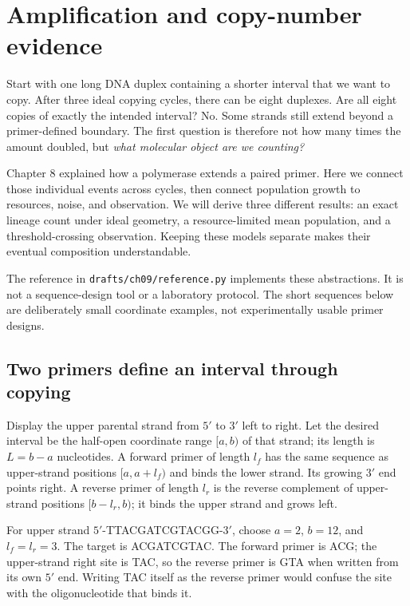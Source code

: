 \chapter{Amplification and copy-number evidence}
\label{ch:amplification}

Start with one long DNA duplex containing a shorter interval that we want to copy. After three ideal copying cycles, there can be eight duplexes. Are all eight copies of exactly the intended interval? No. Some strands still extend beyond a primer-defined boundary. The first question is therefore not how many times the amount doubled, but \emph{what molecular object are we counting?}

Chapter 8 explained how a polymerase extends a paired primer. Here we connect those individual events across cycles, then connect population growth to resources, noise, and observation. We will derive three different results: an exact lineage count under ideal geometry, a resource-limited mean population, and a threshold-crossing observation. Keeping these models separate makes their eventual composition understandable.

The reference in \texttt{drafts/ch09/reference.py} implements these abstractions. It is not a sequence-design tool or a laboratory protocol. The short sequences below are deliberately small coordinate examples, not experimentally usable primer designs.

\section{Two primers define an interval through copying}
Display the upper parental strand from $5'$ to $3'$ left to right. Let the desired interval be the half-open coordinate range $[a,b)$ of that strand; its length is $L=b-a$ nucleotides. A forward primer of length $l_f$ has the same sequence as upper-strand positions $[a,a+l_f)$ and binds the lower strand. Its growing $3'$ end points right. A reverse primer of length $l_r$ is the reverse complement of upper-strand positions $[b-l_r,b)$; it binds the upper strand and grows left.

For upper strand $5'$-TTACGATCGTACGG-$3'$, choose $a=2$, $b=12$, and $l_f=l_r=3$. The target is ACGATCGTAC. The forward primer is ACG; the upper-strand right site is TAC, so the reverse primer is GTA when written from its own $5'$ end. Writing TAC itself as the reverse primer would confuse the site with the oligonucleotide that binds it.

